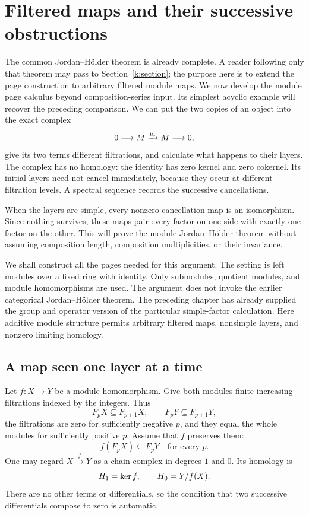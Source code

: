 \section{Filtered maps and their successive obstructions}\label{s:chapter}

The common Jordan--H\"older theorem is already complete. A reader following
only that theorem may pass to Section~\ref{k:section}; the purpose here
is to extend the page construction to arbitrary filtered module maps.
We now develop the module page calculus beyond composition-series input.
Its simplest acyclic example will recover the preceding comparison.
We can put the two copies of an object into the exact complex
\[
0\longrightarrow M\xrightarrow{\mathrm{id}}M\longrightarrow0,
\]
give its two terms different filtrations, and calculate what happens to
their layers. The complex has no homology: the identity has zero kernel
and zero cokernel. Its initial layers need not cancel immediately,
because they occur at different filtration levels. A spectral sequence
records the successive cancellations.

When the layers are simple, every nonzero cancellation map is an
isomorphism. Since nothing survives, these maps pair every factor on one
side with exactly one factor on the other. This will prove the module
Jordan--H\"older theorem without assuming composition length, composition
multiplicities, or their invariance.

We shall construct all the pages needed for this argument. The setting is
left modules over a fixed ring with identity. Only submodules, quotient
modules, and module homomorphisms are used. The argument does not invoke
the earlier categorical Jordan--H\"older theorem. The preceding chapter
has already supplied the group and operator version of the particular
simple-factor calculation. Here additive module structure permits
arbitrary filtered maps, nonsimple layers, and nonzero limiting homology.

\subsection{A map seen one layer at a time}

Let $f:X\to Y$ be a module homomorphism. Give both modules finite
increasing filtrations indexed by the integers. Thus
\[
F_pX\subseteq F_{p+1}X,\qquad F_pY\subseteq F_{p+1}Y,
\]
the filtrations are zero for sufficiently negative $p$, and they equal
the whole modules for sufficiently positive $p$. Assume that $f$ preserves
them:
\[
f(F_pX)\subseteq F_pY\quad\text{for every }p.
\]
One may regard $X\xrightarrow{f}Y$ as a chain complex in degrees $1$ and
$0$. Its homology is
\[
H_1=\operatorname{ker} f,\qquad H_0=Y/f(X).
\]
There are no other terms or differentials, so the condition that two
successive differentials compose to zero is automatic.

